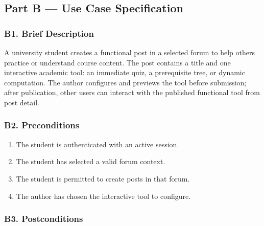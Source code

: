 \documentclass[12pt]{article}
\begin{document}
\hypertarget{sec:part-b-use-case-specification}{}
\subsection*{Part B --- Use Case Specification}
\par\medskip

\hypertarget{sec:b1-brief-description}{}
\subsubsection*{B1. Brief Description}
\par\medskip

A university student creates a functional post in a selected forum to help others practice or understand course content. The post contains a title and one interactive academic tool: an immediate quiz, a prerequisite tree, or dynamic computation. The author configures and previews the tool before submission; after publication, other users can interact with the published functional tool from post detail.
\par\medskip

\hypertarget{sec:b2-preconditions}{}
\subsubsection*{B2. Preconditions}
\par\medskip

\begin{enumerate}
\item The student is authenticated with an active session.
\item The student has selected a valid forum context.
\item The student is permitted to create posts in that forum.
\item The author has chosen the interactive tool to configure.
\end{enumerate}
\par\medskip

\hypertarget{sec:b3-postconditions}{}
\subsubsection*{B3. Postconditions}
\par\medskip
\end{document}
